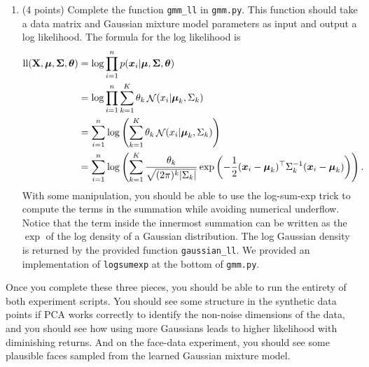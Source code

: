 \documentclass[10pt]{article}
\newcommand{\bx}{{\boldsymbol x}}
\newcommand{\bX}{\mathbf {X}}
\newcommand{\bmu}{{\boldsymbol \mu}}
\newcommand{\bSigma}{{\boldsymbol \Sigma}}
\newcommand{\btheta}{{\boldsymbol \theta}}
\DeclareMathOperator*{\normal}{{\cal N}}
\begin{document}
\begin{enumerate}
\item (4 points) Complete the function \texttt{gmm\_ll} in \texttt{gmm.py}. This function should take a data matrix and Gaussian mixture model parameters as input and output a log likelihood. The formula for the log likelihood is
\begin{equation}
\begin{aligned}
\mathrm{ll}(\bX, \bmu, \bSigma, \btheta) &= \log \prod_{i=1}^n p(\bx_i | \bmu, \bSigma, \btheta)\\
&= \log \prod_{i=1}^n \sum_{k = 1}^K \theta_k \normal(x_i | \bmu_k, \Sigma_k)\\
&=  \sum_{i=1}^n \log \left(\sum_{k = 1}^K \theta_k \normal(x_i | \bmu_k, \Sigma_k) \right)\\
&=  \sum_{i=1}^n \log \left(\sum_{k = 1}^K  \frac{\theta_k}{\sqrt{(2\pi)^k|\Sigma_k|}} \exp\left(- \frac{1}{2} (\bx_i - \bmu_k)^\top \Sigma_k^{-1} (\bx_i - \bmu_k)\right) \right).
\end{aligned}
\end{equation}
With some manipulation, you should be able to use the log-sum-exp trick to compute the terms in the summation while avoiding numerical underflow. Notice that the term inside the innermost summation can be written as the $\exp$ of the log density of a Gaussian distribution. The log Gaussian density is returned by the provided function \texttt{gaussian\_ll}.
We provided an implementation of \texttt{logsumexp} at the bottom of \texttt{gmm.py}.

\end{enumerate}

Once you complete these three pieces, you should be able to run the entirety of both experiment scripts. You should see some structure in the synthetic data points if PCA works correctly to identify the non-noise dimensions of the data, and you should see how using more Gaussians leads to higher likelihood with diminishing returns. And on the face-data experiment, you should see some plausible faces sampled from the learned Gaussian mixture model.
\end{document}
